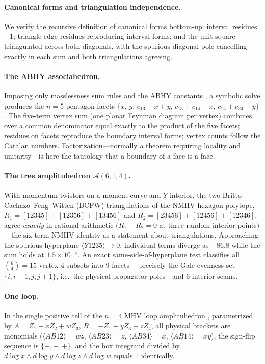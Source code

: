 \documentclass[11pt]{article}
\newcommand{\br}[1]{\langle #1 \rangle}
\begin{document}
\paragraph{Canonical forms and triangulation independence.} We verify
the recursive definition of canonical forms
\citep{ArkaniHamed:2017tmz} bottom-up: interval residues $\pm 1$;
triangle edge-residues reproducing interval forms; and the unit square
triangulated across both diagonals, with the spurious diagonal pole
cancelling exactly in each sum and both triangulations agreeing.

\paragraph{The ABHY associahedron.} Imposing only masslessness sum
rules and the ABHY constants \citep{ArkaniHamed:2017mur}, a symbolic
solve produces the $n = 5$ pentagon facets
$\{x,\, y,\, c_{13} - x + y,\, c_{13} + c_{14} - x,\,
c_{14} + c_{24} - y\}$. The five-term vertex sum (one planar Feynman
diagram per vertex) combines over a common denominator equal exactly to
the product of the five facets; residues on facets reproduce the
boundary interval forms; vertex counts follow the Catalan numbers.
Factorization---normally a theorem requiring locality and unitarity---is
here the tautology that a boundary of a face is a face.

\paragraph{The tree amplituhedron $\mathcal{A}(6,1,4)$.} With momentum
twistors on a moment curve and $Y$ interior, the two Britto--Cachazo--Feng--Witten (BCFW)
triangulations of the NMHV hexagon polytope,
$R_1 = [12345]+[12356]+[13456]$ and $R_2 = [23456]+[12456]+[12346]$,
agree \emph{exactly} in rational arithmetic ($R_1 - R_2 = 0$ at three
random interior points)---the six-term NMHV identity as a statement
about triangulations. Approaching the spurious hyperplane
$\br{Y1235} \to 0$, individual terms diverge as $\pm 86.8$ while the sum
holds at $1.5\times10^{-4}$. An exact same-side-of-hyperplane test
classifies all $\binom{6}{4} = 15$ vertex 4-subsets into 9 facets---
precisely the Gale-evenness set $\{i, i{+}1, j, j{+}1\}$, i.e.\ the
physical propagator poles---and 6 interior seams.

\paragraph{One loop.} In the single positive cell of the $n=4$ MHV loop
amplituhedron \citep{ArkaniHamed:2013kca,Kojima:2020gxs}, parametrized
by $A = Z_1 + xZ_2 + wZ_3$, $B = -Z_1 + yZ_3 + zZ_4$, all physical
brackets are monomials ($\br{AB12} = wz$, $\br{AB23} = z$,
$\br{AB34} = x$, $\br{AB14} = xy$), the sign-flip sequence is
$\{+,-,+\}$, and the box integrand divided by
$d\log x \wedge d\log y \wedge d\log z \wedge d\log w$ equals $1$
identically.
\end{document}
